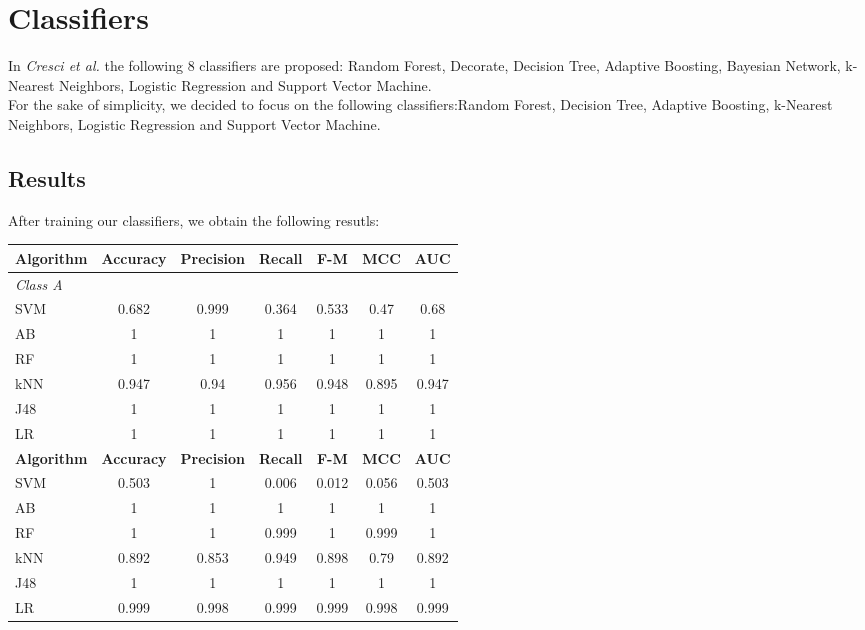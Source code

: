 \documentclass[a4paper,11pt]{article}
\begin{document}
\section{Classifiers}
In \textit{Cresci et al.} the following 8 classifiers are proposed: Random Forest, Decorate, Decision Tree, Adaptive Boosting, Bayesian Network, k-Nearest Neighbors, Logistic Regression and Support Vector Machine.\\

For the sake of simplicity, we decided to focus on the following classifiers:Random Forest,  Decision Tree, Adaptive Boosting, k-Nearest Neighbors, Logistic Regression and Support Vector Machine.\\

\subsection{Results}
After training our classifiers, we obtain the following resutls:

\begin{tabular}{lcccccc}
	\hline
	\textbf{Algorithm} 	& \textbf{Accuracy} 	& \textbf{Precision} & \textbf{Recall} &\textbf{F-M} 	& \textbf{MCC} & AUC\\
	\hline
	\textit{Class A}\\
	SVM	&	0.682	&	0.999	&	0.364	& 0.533 & 0.47 & 0.68\\
	AB	&	1		&	1		&	1		& 1 	&	1	& 1   \\
	RF	&	1		&	1		&	1		& 1   	&	1	& 1  \\
	kNN	&	0.947	&	0.94	&	0.956	& 0.948 & 0.895 & 0.947\\
	J48	&	1		&	1		&	1		& 1 	&	1	& 1   \\
	LR	&	1		&	1		&	1		& 1 	&	1	& 1   \\
	\hline
	\textbf{Algorithm} 	& \textbf{Accuracy} 	& \textbf{Precision} & \textbf{Recall} & \textbf{F-M} 	& \textbf{MCC} & \textbf{AUC}\\
	\hline
	SVM	&	0.503	&	1		&	0.006	& 0.012 &  0.056   & 0.503 \\
	AB	&	1		&	1		&	1		& 1 	&	1		& 1   \\
	RF	&	1		&	1		&	0.999	& 1   	&	0.999	& 1  	\\
	kNN	&	0.892	&	0.853	&	0.949	& 0.898 &   0.79 	& 0.892 \\
	J48	&	1		&	1		&	1		& 1 	&	1		& 1   	\\
	LR	&	0.999	&	0.998	&	0.999	& 0.999 &	0.998	& 0.999   \\
		
\end{tabular}
	
\end{document}
